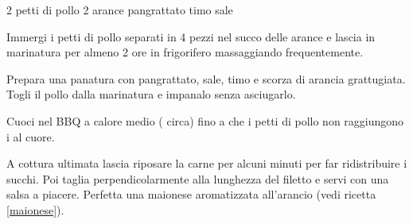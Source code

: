 \begin{ingreds}
	2 petti di pollo 
	2 arance 
	pangrattato 
	timo
	sale

\end{ingreds}

\begin{method}
Immergi i petti di pollo separati in 4 pezzi nel succo delle arance e lascia in marinatura per almeno 2 ore in frigorifero massaggiando frequentemente.

Prepara una panatura con pangrattato, sale, timo e scorza di arancia grattugiata. Togli il pollo dalla marinatura e impanalo senza asciugarlo.

Cuoci nel BBQ a calore medio ( circa) fino a che i petti di pollo non raggiungono i  al cuore.

A cottura ultimata lascia riposare la carne per alcuni minuti per far ridistribuire i succhi. Poi taglia perpendicolarmente alla lunghezza del filetto e servi con una salsa a piacere. Perfetta una maionese aromatizzata all'arancio (vedi ricetta \ref{maionese}).


\end{method}




